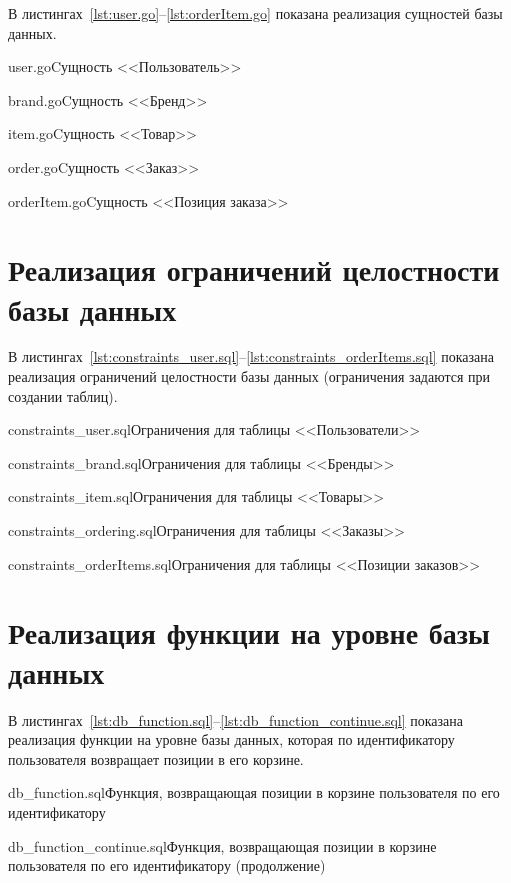 \documentclass{bmstu}
\begin{document}
В листингах~\ref{lst:user.go}--\ref{lst:orderItem.go} показана реализация сущностей базы данных.

{user.go}{Cущность <<Пользователь>>}

{brand.go}{Cущность <<Бренд>>}

{item.go}{Cущность <<Товар>>}

\pagebreak

{order.go}{Cущность <<Заказ>>}

{orderItem.go}{Cущность <<Позиция заказа>>}



\section{Реализация ограничений целостности базы данных}

В листингах~\ref{lst:constraints_user.sql}--\ref{lst:constraints_orderItems.sql} показана реализация ограничений целостности базы данных (ограничения задаются при создании таблиц).

{constraints_user.sql}{Ограничения для таблицы <<Пользователи>>}

\pagebreak

{constraints_brand.sql}{Ограничения для таблицы <<Бренды>>}

{constraints_item.sql}{Ограничения для таблицы <<Товары>>}

{constraints_ordering.sql}{Ограничения для таблицы <<Заказы>>}

\pagebreak

{constraints_orderItems.sql}{Ограничения для таблицы <<Позиции заказов>>}

\section{Реализация функции на уровне базы данных}

В листингах~\ref{lst:db_function.sql}--\ref{lst:db_function_continue.sql} показана реализация функции на уровне базы данных, которая по идентификатору пользователя возвращает позиции в его корзине. 

{db_function.sql}{Функция, возвращающая позиции в корзине пользователя по его идентификатору}

{db_function_continue.sql}{Функция, возвращающая позиции в корзине пользователя по его идентификатору (продолжение)}
\end{document}
